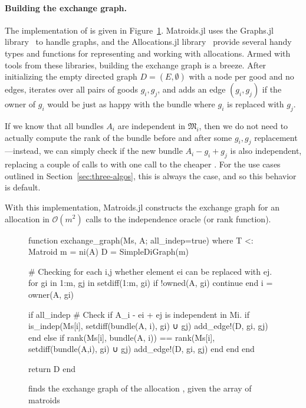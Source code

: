 \paragraph{Building the exchange graph.} The implementation of  is given in Figure~\ref{code:exchange_graph}. Matroids.jl uses the Graphs.jl library~\cite{Graphs2021} to handle graphs, and the Allocations.jl library~\cite{Hetland_Allocations_jl_2022} provide several handy types and functions for representing and working with allocations. Armed with tools from these libraries, building the exchange graph is a breeze. After initializing the empty directed graph $D = (E, \emptyset)$ with a node per good and no edges,  iterates over all pairs of goods $g_i, g_j$, and adds an edge $(g_i, g_j)$ if the owner of $g_i$ would be just as happy with the bundle where $g_i$ is replaced with $g_j$.

If we know that all bundles $A_i$ are independent in $\mathfrak{M}_i$, then we do not need to actually compute the rank of the bundle before and after some $g_i, g_j$ replacement---instead, we can simply check if the new bundle $A_i - g_i + g_j$ is also independent, replacing a couple of calls to  with one call to the cheaper . For the use cases outlined in Section~\ref{sec:three-algos}, this is always the case, and so this behavior is default.

With this implementation, Matroids.jl constructs the exchange graph for an allocation in $\mathcal{O}(m^2)$ calls to the independence oracle (or rank function).

\begin{figure}
\begin{jllisting}
  
function exchange_graph(Ms, A; all_indep=true) where T <: Matroid
  m = ni(A)
  D = SimpleDiGraph(m)
  
  # Checking for each i,j whether element ei can be replaced with ej.
  for gi in 1:m, gj in setdiff(1:m, gi)
    if !owned(A, gi) continue end
    i = owner(A, gi)

    if all_indep
      # Check if A_i - ei + ej is independent in Mi.
      if is_indep(Ms[i], setdiff(bundle(A, i), gi) ∪ gj)
        add_edge!(D, gi, gj)
      end
    else
      if rank(Ms[i], bundle(A, i)) == rank(Ms[i], setdiff(bundle(A,i), gi) ∪ gj)
        add_edge!(D, gi, gj)
      end
    end
  end

  return D
end

\end{jllisting}
\caption{ finds the exchange graph of the allocation , given the array of matroids }
\label{code:exchange_graph}
\end{figure}

